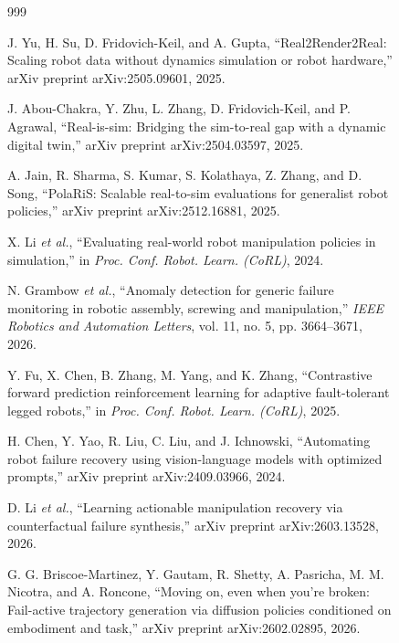 \documentclass[12pt,a4paper,oneside]{report}
\begin{document}
\begin{figure}[H]
\begin{thebibliography}{999}

J. Yu, H. Su, D. Fridovich-Keil, and A. Gupta, ``{Real2Render2Real}: Scaling robot data without dynamics simulation or robot hardware,'' arXiv preprint arXiv:2505.09601, 2025.


J. Abou-Chakra, Y. Zhu, L. Zhang, D. Fridovich-Keil, and P. Agrawal, ``Real-is-sim: Bridging the sim-to-real gap with a dynamic digital twin,'' arXiv preprint arXiv:2504.03597, 2025.


A. Jain, R. Sharma, S. Kumar, S. Kolathaya, Z. Zhang, and D. Song, ``{PolaRiS}: Scalable real-to-sim evaluations for generalist robot policies,'' arXiv preprint arXiv:2512.16881, 2025.


X. Li \textit{et al.}, ``Evaluating real-world robot manipulation policies in simulation,'' in \textit{Proc. Conf. Robot. Learn. (CoRL)}, 2024.


N. Grambow \textit{et al.}, ``Anomaly detection for generic failure monitoring in robotic assembly, screwing and manipulation,'' \textit{IEEE Robotics and Automation Letters}, vol. 11, no. 5, pp. 3664--3671, 2026.


Y. Fu, X. Chen, B. Zhang, M. Yang, and K. Zhang, ``Contrastive forward prediction reinforcement learning for adaptive fault-tolerant legged robots,'' in \textit{Proc. Conf. Robot. Learn. (CoRL)}, 2025.


H. Chen, Y. Yao, R. Liu, C. Liu, and J. Ichnowski, ``Automating robot failure recovery using vision-language models with optimized prompts,'' arXiv preprint arXiv:2409.03966, 2024.


D. Li \textit{et al.}, ``Learning actionable manipulation recovery via counterfactual failure synthesis,'' arXiv preprint arXiv:2603.13528, 2026.


G. G. Briscoe-Martinez, Y. Gautam, R. Shetty, A. Pasricha, M. M. Nicotra, and A. Roncone, ``Moving on, even when you're broken: Fail-active trajectory generation via diffusion policies conditioned on embodiment and task,'' arXiv preprint arXiv:2602.02895, 2026.


\end{thebibliography}
\end{figure}
\end{document}
